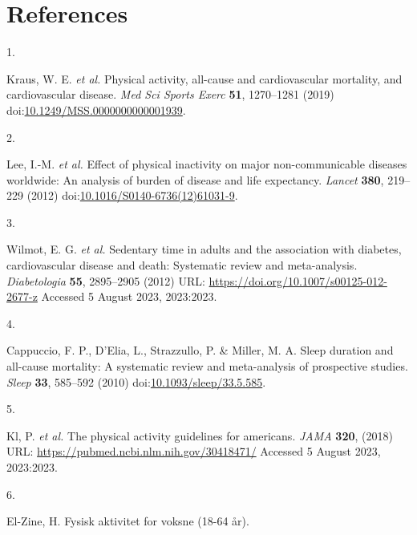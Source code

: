 \documentclass[
  9pt,
]{article}
\newlength{\cslhangindent}
\newlength{\csllabelwidth}
\newlength{\cslentryspacingunit} %
\newenvironment{CSLReferences}[2] %
 {%
  \setlength{\parindent}{0pt}
  \ifodd #1
  \let\oldpar\par
  \def\par{\hangindent=\cslhangindent\oldpar}
  \fi
  \setlength{\parskip}{#2\cslentryspacingunit}
 }%
 {}
\newcommand{\CSLLeftMargin}[1]{\parbox[t]{\csllabelwidth}{#1}}
\newcommand{\CSLRightInline}[1]{\parbox[t]{\linewidth - \csllabelwidth}{#1}\break}
\begin{document}
\newpage

\hypertarget{references}{%
\section{References}\label{references}}

\hypertarget{refs}{}
\begin{CSLReferences}{0}{0}
\leavevmode{}%
\CSLLeftMargin{1. }%
\CSLRightInline{Kraus, W. E. \emph{et al.} Physical activity, all-cause
and cardiovascular mortality, and cardiovascular disease. \emph{Med Sci
Sports Exerc} \textbf{51}, 1270--1281 (2019)
doi:\href{https://doi.org/10.1249/MSS.0000000000001939}{10.1249/MSS.0000000000001939}.}

\leavevmode{}%
\CSLLeftMargin{2. }%
\CSLRightInline{Lee, I.-M. \emph{et al.} Effect of physical inactivity
on major non-communicable diseases worldwide: An analysis of burden of
disease and life expectancy. \emph{Lancet} \textbf{380}, 219--229 (2012)
doi:\href{https://doi.org/10.1016/S0140-6736(12)61031-9}{10.1016/S0140-6736(12)61031-9}.}

\leavevmode{}%
\CSLLeftMargin{3. }%
\CSLRightInline{Wilmot, E. G. \emph{et al.} Sedentary time in adults and
the association with diabetes, cardiovascular disease and death:
Systematic review and meta-analysis. \emph{Diabetologia} \textbf{55},
2895--2905 (2012) URL: \url{https://doi.org/10.1007/s00125-012-2677-z}
Accessed 5 August 2023, 2023:2023.}

\leavevmode{}%
\CSLLeftMargin{4. }%
\CSLRightInline{Cappuccio, F. P., D'Elia, L., Strazzullo, P. \& Miller,
M. A. Sleep duration and all-cause mortality: A systematic review and
meta-analysis of prospective studies. \emph{Sleep} \textbf{33}, 585--592
(2010)
doi:\href{https://doi.org/10.1093/sleep/33.5.585}{10.1093/sleep/33.5.585}.}

\leavevmode{}%
\CSLLeftMargin{5. }%
\CSLRightInline{Kl, P. \emph{et al.} The physical activity guidelines
for americans. \emph{{JAMA}} \textbf{320}, (2018) URL:
\url{https://pubmed.ncbi.nlm.nih.gov/30418471/} Accessed 5 August 2023,
2023:2023.}

\leavevmode{}%
\CSLLeftMargin{6. }%
\CSLRightInline{El-Zine, H. Fysisk aktivitet for voksne (18-64 år).}


\end{CSLReferences}
\end{document}
